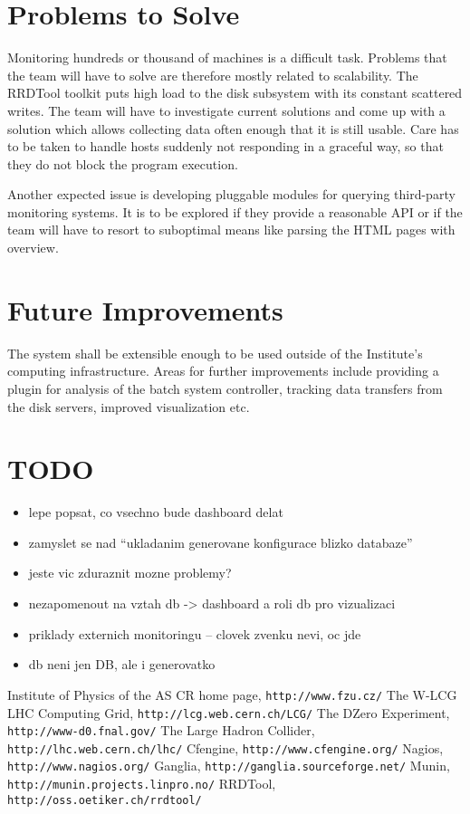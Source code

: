 \documentclass[12pt]{article}
\begin{document}
\section{Problems to Solve}

Monitoring hundreds or thousand of machines is a difficult task.  Problems that the team will have to solve are therefore mostly
related to scalability.  The RRDTool toolkit puts high load to the disk subsystem with its constant scattered writes.  The team
will have to investigate current solutions and come up with a solution which allows collecting data often enough that it is still
usable.  Care has to be taken to handle hosts suddenly not responding in a graceful way, so that they do not block the program
execution.

Another expected issue is developing pluggable modules for querying third-party monitoring systems.  It is to be explored if they
provide a reasonable API or if the team will have to resort to suboptimal means like parsing the HTML pages with overview.

\section{Future Improvements}

The system shall be extensible enough to be used outside of the Institute's computing infrastructure.  Areas for further
improvements include providing a plugin for analysis of the batch system controller, tracking data transfers from the disk
servers, improved visualization etc.

\section{TODO}

\begin{itemize}
    \item{lepe popsat, co vsechno bude dashboard delat}
    \item{zamyslet se nad ``ukladanim generovane konfigurace blizko databaze''}
    \item{jeste vic zduraznit mozne problemy?}
    \item{nezapomenout na vztah db -> dashboard a roli db pro vizualizaci}
    \item{priklady externich monitoringu -- clovek zvenku nevi, oc jde}
    \item{db neni jen DB, ale i generovatko}
\end{itemize}

\begin{thebibliography}{9}
    Institute of Physics of the AS CR home page, {\tt http://www.fzu.cz/}
    The W-LCG LHC Computing Grid, {\tt http://lcg.web.cern.ch/LCG/}
    The DZero Experiment, {\tt http://www-d0.fnal.gov/}
    The Large Hadron Collider, {\tt http://lhc.web.cern.ch/lhc/}
    Cfengine, {\tt http://www.cfengine.org/}
    Nagios, {\tt http://www.nagios.org/}
    Ganglia, {\tt http://ganglia.sourceforge.net/}
    Munin, {\tt http://munin.projects.linpro.no/}
    RRDTool, {\tt http://oss.oetiker.ch/rrdtool/}
\end{thebibliography}
\end{document}
